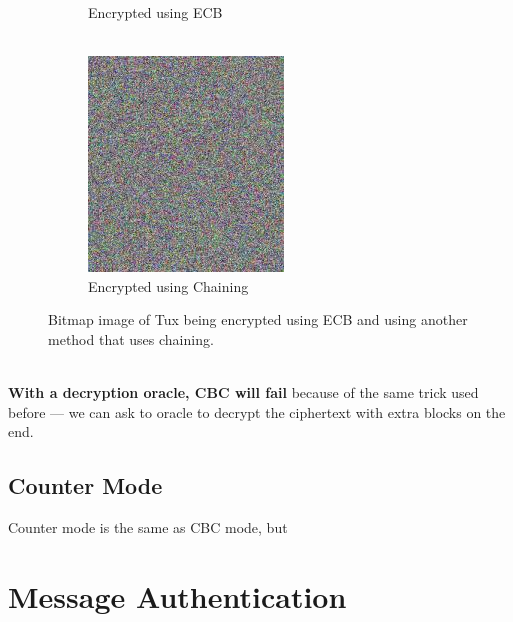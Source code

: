 \begin{figure}[htp!]
\begin{subfigure}[b]{0.3\textwidth}
            \caption{Encrypted using ECB\\~}
        \end{subfigure}
        \begin{subfigure}[b]{0.3\textwidth}
            \centering
            \includegraphics[width=\textwidth]{img/Tux_secure.jpg}
            \caption{Encrypted using Chaining}
        \end{subfigure}
        \caption{Bitmap image of Tux being encrypted using ECB and using another method that uses chaining.}
        \label{fig:tux}
    \end{figure}
    \\
    \textbf{With a decryption oracle, CBC will fail} because of the same trick used before --- we can ask to oracle to decrypt the ciphertext with extra blocks on the end.
    
    
    
    \subsection{Counter Mode}
    Counter mode is the same as CBC mode, but 

\section{Message Authentication}
